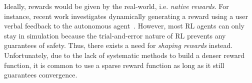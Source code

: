 Ideally, rewards would be given by the real-world, i.e. \textit{native rewards}. For instance, recent work investigates dynamically generating a reward 
using a user verbal feedback to the autonomous agent~\cite{gonzalez2010}.
%
%
However, most RL agents can only stay in simulation because the trial-and-error nature of RL prevents any guarantees of safety.
Thus, there exists a need for \textit{shaping rewards} instead.
%
Unfortunately, due to the lack of systematic methods to build a denser reward function, 
it is common to use a sparse reward function as long as it still guarantees convergence.
